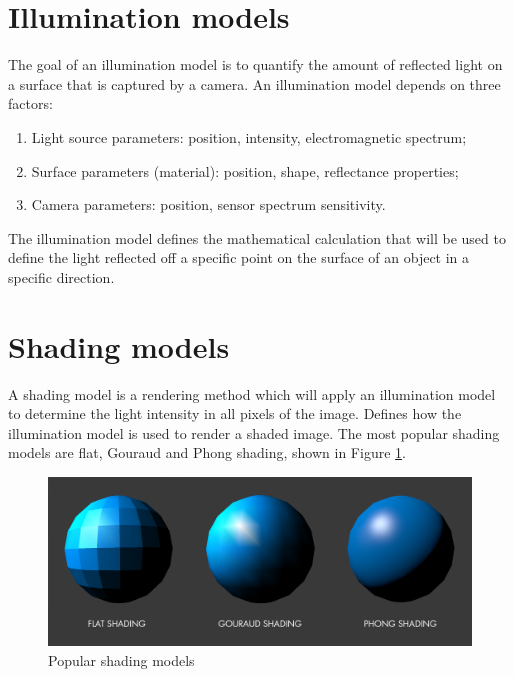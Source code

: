 \section{Illumination models}
The goal of an illumination model is to quantify the amount of reflected light on a surface that is captured by a camera. An illumination model depends on three factors:

\begin{enumerate}
    \item Light source parameters: position, intensity, electromagnetic spectrum;
    \item Surface parameters (material): position, shape, reflectance properties;
    \item Camera parameters: position, sensor spectrum sensitivity.
\end{enumerate}

The illumination model defines the mathematical calculation that will be used to define the light reflected off a specific point on the surface of an object in a specific direction.

\section{Shading models}
A shading model is a rendering method which will apply an illumination model to determine the light intensity in all pixels of the image. Defines how the illumination model is used to render a shaded image. The most popular shading models are flat, Gouraud and Phong shading, shown in Figure \ref{fig:shading_models}.

\begin{figure}[h]
    \begin{center}
        \includegraphics[width = 15cm]{figs/shading_models.png}
    \end{center}
    \caption{Popular shading models}
    \label{fig:shading_models}
\end{figure}

